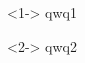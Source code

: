 \documentclass{beamer}
\begin{document}
\begin{frame}
    \begin{definition}<1->
        qwq1 %
    \end{definition}
    \begin{definition}<2->
        qwq2 %
    \end{definition}
\end{frame}
\end{document}
